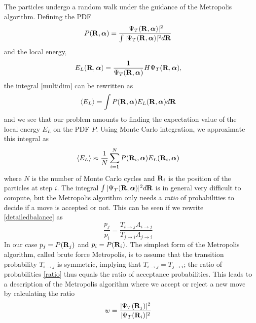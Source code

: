 \documentclass[english, a4paper]{article}
\begin{document}
\noindent The particles undergo a random walk under the guidance of the Metropolis algorithm. 
Defining the PDF 
\begin{equation}
 P({\bf R}, \boldsymbol{\alpha}) = \frac{|\Psi_T({\bf R},\boldsymbol{\alpha})
 |^2}{\int |\Psi_T({\bf R}, \boldsymbol{\alpha})|^2 d{\bf R}}
\end{equation}
and the local energy,
\begin{equation}
    E_L({\bf R, \boldsymbol{\alpha}})=\frac{1}{\Psi_T({\bf R, \boldsymbol{\alpha}})}H
    \Psi_T({\bf R}, \boldsymbol{\alpha}),
    \label{localenergy}
 \end{equation}
the integral \eqref{multidim} can be rewritten as
\begin{equation}
 \langle E_L \rangle = \int P({\bf R}, \boldsymbol{\alpha}) E_L({\bf R}, \boldsymbol{\alpha}) d{\bf R}
 \label{localEnergyExp}
\end{equation}
and we see that our problem amounts to finding the expectation value of the local energy $E_L$ on the PDF $P$.
Using Monte Carlo integration, we approximate this integral as
\begin{equation}
 \langle E_L \rangle \approx \frac{1}{N} \sum_{i=1}^N P({\bf R}_i, \boldsymbol{\alpha}) E_L({\bf R}_i, \boldsymbol{\alpha})
\end{equation}
where $N$ is the number of Monte Carlo cycles and ${\bf R}_i$ is the position of the particles at step $i$. 
The integral $\int |\Psi_T({\bf R}, \boldsymbol{\alpha})|^2 d{\bf R}$ is in general very difficult to compute, 
but the Metropolis algorithm only needs
a \textit{ratio} of probabilities to decide if a move is accepted or not. This can be seen if we rewrite 
\eqref{detailedbalance} as
\begin{equation}
 \frac{p_j}{p_i} = \frac{T_{i\rightarrow j} A_{i\rightarrow j}}{T_{j\rightarrow i} A_{j\rightarrow i}}
 \label{ratio}
\end{equation}
In our case $p_j = P({\bf R}_j)$ and $p_i = P({\bf R}_i)$. 
The simplest form of the Metropolis algorithm, called brute force Metropolis, is to assume that
the transition probability $T_{i\rightarrow j}$ is symmetric, implying that $T_{i\rightarrow j} = T_{j\rightarrow i}$;
the ratio of probabilities \eqref{ratio} thus equals the ratio of acceptance probabilities. 
This leads to a  description of the Metropolis algorithm where we accept or reject a new 
move by calculating the ratio 
\begin{equation}
 w = \frac{|\Psi_T({\bf R}_j)|^2}{|\Psi_T({\bf R}_i)|^2}
 \label{ratio2}
\end{equation}
\end{document}

